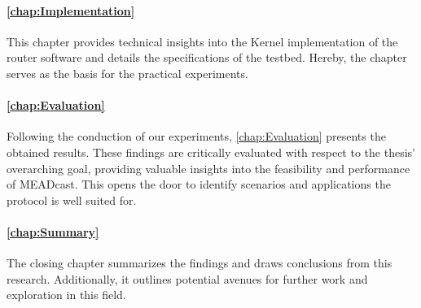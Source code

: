 \paragraph{\autoref{chap:Implementation}} %
\label{par:Intro_Structure_Implementation}
This chapter provides technical insights into the Kernel implementation of the
    router software and details the specifications of the testbed.
Hereby, the chapter serves as the basis for the practical experiments.

\paragraph{\autoref{chap:Evaluation}} %
\label{par:Intro_Structure_Evaluation}
Following the conduction of our experiments, \autoref{chap:Evaluation} presents
    the obtained results. 
These findings are critically evaluated with respect to the thesis' overarching
    goal, providing valuable insights into the feasibility and performance of
    MEADcast.
This opens the door to identify scenarios and applications the protocol is
    well suited for.

\paragraph{\autoref{chap:Summary}} %
\label{par:Intro_Structure_Summary}
The closing chapter summarizes the findings and draws conclusions from this
    research.
Additionally, it outlines potential avenues for further work and exploration in
    this field.

